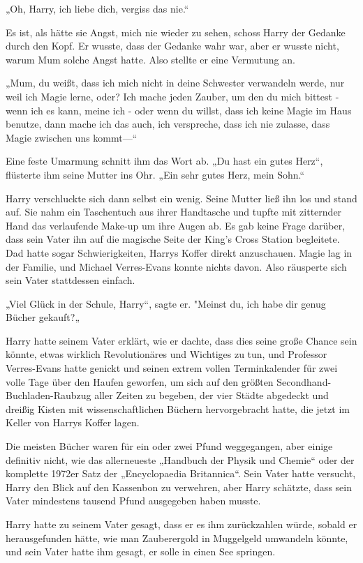 {„Oh, Harry, ich liebe dich, vergiss das nie.“

Es ist, als hätte sie Angst, mich nie wieder zu sehen, schoss Harry der Gedanke durch den Kopf. Er wusste, dass der Gedanke wahr war, aber er wusste nicht, warum Mum solche Angst hatte. Also stellte er eine Vermutung an.

„Mum, du weißt, dass ich mich nicht in deine Schwester verwandeln werde, nur weil ich Magie lerne, oder? Ich mache jeden Zauber, um den du mich bittest - wenn ich es kann, meine ich - oder wenn du willst, dass ich keine Magie im Haus benutze, dann mache ich das auch, ich verspreche, dass ich nie zulasse, dass Magie zwischen uns kommt—“

Eine feste Umarmung schnitt ihm das Wort ab. „Du hast ein gutes Herz“, flüsterte ihm seine Mutter ins Ohr. „Ein sehr gutes Herz, mein Sohn.“

Harry verschluckte sich dann selbst ein wenig. Seine Mutter ließ ihn los und stand auf. Sie nahm ein Taschentuch aus ihrer Handtasche und tupfte mit zitternder Hand das verlaufende Make-up um ihre Augen ab. Es gab keine Frage darüber, dass sein Vater ihn auf die magische Seite der King's Cross Station begleitete. Dad hatte sogar Schwierigkeiten, Harrys Koffer direkt anzuschauen. Magie lag in der Familie, und Michael Verres-Evans konnte nichts davon. Also räusperte sich sein Vater stattdessen einfach.

„Viel Glück in der Schule, Harry“, sagte er. "Meinst du, ich habe dir genug Bücher gekauft?„

Harry hatte seinem Vater erklärt, wie er dachte, dass dies seine große Chance sein könnte, etwas wirklich Revolutionäres und Wichtiges zu tun, und Professor Verres-Evans hatte genickt und seinen extrem vollen Terminkalender für zwei volle Tage über den Haufen geworfen, um sich auf den größten Secondhand-Buchladen-Raubzug aller Zeiten zu begeben, der vier Städte abgedeckt und dreißig Kisten mit wissenschaftlichen Büchern hervorgebracht hatte, die jetzt im Keller von Harrys Koffer lagen.

Die meisten Bücher waren für ein oder zwei Pfund weggegangen, aber einige definitiv nicht, wie das allerneueste „Handbuch der Physik und Chemie“ oder der komplette 1972er Satz der „Encyclopaedia Britannica“. Sein Vater hatte versucht, Harry den Blick auf den Kassenbon zu verwehren, aber Harry schätzte, dass sein Vater mindestens tausend Pfund ausgegeben haben musste.

Harry hatte zu seinem Vater gesagt, dass er es ihm zurückzahlen würde, sobald er herausgefunden hätte, wie man Zauberergold in Muggelgeld umwandeln könnte, und sein Vater hatte ihm gesagt, er solle in einen See springen.

}
